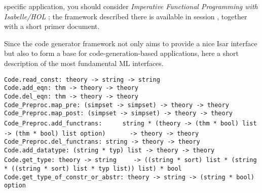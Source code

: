 \begin{isabellebody}
\begin{isamarkuptext}
  specific application, you should consider \emph{Imperative
  Functional Programming with Isabelle/HOL}
  \cite{bulwahn-et-al:2008:imperative}; the framework described there
  is available in session , together with a
  short primer document.%
\end{isamarkuptext}%
\isamarkuptrue%
%
\isamarkuptrue%
%
\begin{isamarkuptext}%
Since the code generator framework not only aims to provide a nice
  Isar interface but also to form a base for code-generation-based
  applications, here a short description of the most fundamental ML
  interfaces.%
\end{isamarkuptext}%
\isamarkuptrue%
%
\isamarkuptrue%
%
\isadelimmlref
%
\endisadelimmlref
%
\isatagmlref
%
\begin{isamarkuptext}%
\begin{mldecls}
  \verb|Code.read_const: theory -> string -> string| \\
  \verb|Code.add_eqn: thm -> theory -> theory| \\
  \verb|Code.del_eqn: thm -> theory -> theory| \\
  \verb|Code_Preproc.map_pre: (simpset -> simpset) -> theory -> theory| \\
  \verb|Code_Preproc.map_post: (simpset -> simpset) -> theory -> theory| \\
  \verb|Code_Preproc.add_functrans: |\isasep\isanewline%
\verb|    string * (theory -> (thm * bool) list -> (thm * bool) list option)|\isasep\isanewline%
\verb|      -> theory -> theory| \\
  \verb|Code_Preproc.del_functrans: string -> theory -> theory| \\
  \verb|Code.add_datatype: (string * typ) list -> theory -> theory| \\
  \verb|Code.get_type: theory -> string|\isasep\isanewline%
\verb|    -> ((string * sort) list * (string * ((string * sort) list * typ list)) list) * bool| \\
  \verb|Code.get_type_of_constr_or_abstr: theory -> string -> (string * bool) option|
  \end{mldecls}


\end{isamarkuptext}
\end{isabellebody}
